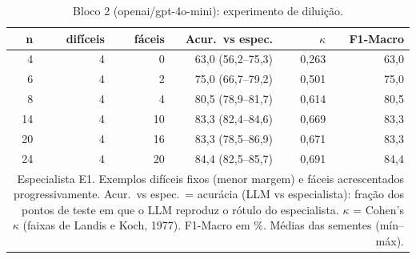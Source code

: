 \begin{table}[htbp]
\centering
\small
\caption{Bloco 2 (openai/gpt-4o-mini): experimento de diluição.}
\label{tab:bloco2_E1_diluicao_gpt4mini}
\begin{tabular}{rrrrrr}
\toprule
n & difíceis & fáceis & Acur.\ vs espec. & $\kappa$ & F1-Macro \\
\midrule
4 & 4 & 0 & 63,0 (56,2–75,3) & 0,263 & 63,0 \\
6 & 4 & 2 & 75,0 (66,7–79,2) & 0,501 & 75,0 \\
8 & 4 & 4 & 80,5 (78,9–81,7) & 0,614 & 80,5 \\
14 & 4 & 10 & 83,3 (82,4–84,6) & 0,669 & 83,3 \\
20 & 4 & 16 & 83,3 (78,5–86,9) & 0,671 & 83,3 \\
24 & 4 & 20 & 84,4 (82,5–85,7) & 0,691 & 84,4 \\
\bottomrule
\multicolumn{6}{p{0.95\linewidth}}{\footnotesize Especialista E1. Exemplos difíceis fixos (menor margem) e fáceis acrescentados progressivamente. Acur.\ vs espec.\ = acurácia (LLM vs especialista): fração dos pontos de teste em que o LLM reproduz o rótulo do especialista. $\kappa$ = Cohen's $\kappa$ (faixas de Landis e Koch, 1977). F1-Macro em \%. Médias das sementes (mín–máx).} \\
\end{tabular}
\end{table}
